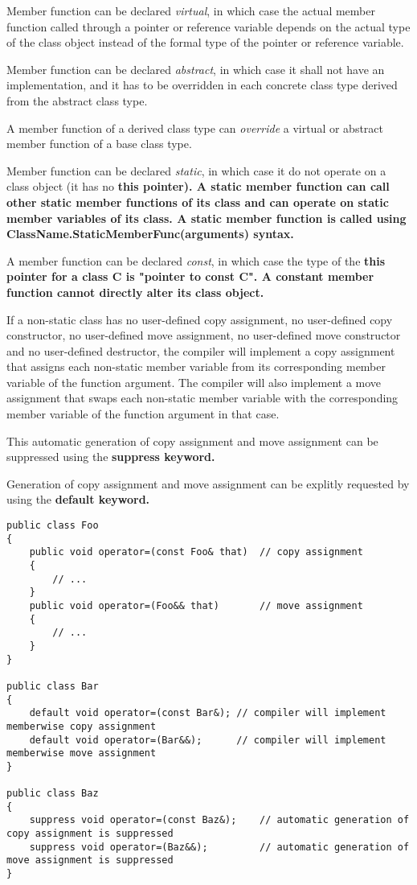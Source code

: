 \documentclass[a4paper,oneside,11pt]{article}
\begin{document}
Member function can be declared \emph{virtual}, in which case the actual member function called
through a pointer or reference variable depends on the actual type of the class object
instead of the formal type of the pointer or reference variable.

Member function can be declared \emph{abstract}, in which case it shall not have an implementation,
and it has to be overridden in each concrete class type derived from the abstract class type.

A member function of a derived class type can \emph{override} a virtual or abstract member function
of a base class type.

Member function can be declared \emph{static}, in which case it do not operate on a class object
(it has no \bf{this} pointer).
A static member function can call other static member functions of its class and can operate on
static member variables of its class.
A static member function is called using ClassName.StaticMemberFunc(arguments) syntax.

A member function can be declared \emph{const}, in which case the type of the \bf{this} pointer
for a class C is "pointer to \bf{const} C".
A constant member function cannot directly alter its class object.

If a non-static class has no user-defined copy assignment, no user-defined copy constructor,
no user-defined move assignment, no user-defined move constructor and no user-defined destructor,
the compiler will implement a copy assignment that assigns each non-static member variable
from its corresponding member variable of the function argument.
The compiler will also implement a move assignment that swaps each non-static member variable
with the corresponding member variable of the function argument in that case.

This automatic generation of copy assignment and move assignment can be suppressed using the
\bf{suppress} keyword.

Generation of copy assignment and move assignment can be explitly requested by using the \bf{default} keyword.

\begin{lstlisting}[frame=trBL]
public class Foo
{
    public void operator=(const Foo& that)  // copy assignment
    {
        // ...
    }
    public void operator=(Foo&& that)       // move assignment
    {
        // ...
    }
}

public class Bar
{
    default void operator=(const Bar&); // compiler will implement memberwise copy assignment
    default void operator=(Bar&&);      // compiler will implement memberwise move assignment
}

public class Baz
{
    suppress void operator=(const Baz&);    // automatic generation of copy assignment is suppressed
    suppress void operator=(Baz&&);         // automatic generation of move assignment is suppressed
}
\end{lstlisting}
\end{document}
